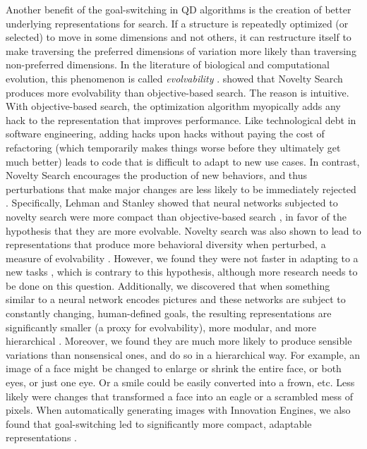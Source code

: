 \documentclass{article}
\begin{document}
Another benefit of the goal-switching in QD algorithms is the creation of better underlying representations for search. If a structure is repeatedly optimized (or selected) to move in some dimensions and not others, it can restructure itself to make traversing the preferred dimensions of variation more likely than traversing non-preferred dimensions. In the literature of biological and computational evolution, this phenomenon is called \emph{evolvability} \cite{kounios2016resolving,kouvaris2015evolution,wagner1996perspective,conrad1979bootstrapping,pigliucci2008evolvability,wagner2013robustness,mengistu2016evolvability}. \citet{lehman2011abandoning} showed that Novelty Search produces more evolvability than objective-based search. The reason is intuitive. With objective-based search, the optimization algorithm myopically adds any hack to the representation that improves performance. Like technological debt in software engineering, adding hacks upon hacks without paying the cost of refactoring (which temporarily makes things worse before they ultimately get much better) leads to code that is difficult to adapt to new use cases. In contrast, Novelty Search encourages the production of new behaviors, and thus perturbations that make major changes are less likely to be immediately rejected \cite{lehman2010efficiently}. Specifically, Lehman and Stanley showed that neural networks subjected to novelty search were more compact than objective-based search \cite{lehman2011abandoning,lehman2011improving}, in favor of the hypothesis that they are more evolvable. Novelty search was also shown to lead to representations that produce more behavioral diversity when perturbed, a measure of evolvability \cite{lehman2011improving}. However, we found they were not faster in adapting to a new tasks \cite{velez2014novelty}, which is contrary to this hypothesis, although more research needs to be done on this question.  Additionally, we discovered that when something similar to a neural network encodes pictures and these networks are subject to constantly changing, human-defined goals, the resulting representations are significantly smaller (a proxy for evolvability), more modular, and more hierarchical \cite{huizinga2017emergence}. Moreover, we found they are much more likely to produce sensible variations than nonsensical ones, and do so in a hierarchical way. For example, an image of a face might be changed to enlarge or shrink the entire face, or both eyes, or just one eye. Or a smile could be easily converted into a frown, etc. Less likely were changes that transformed a face into an eagle or a scrambled mess of pixels. When automatically generating images with Innovation Engines, we also found that goal-switching led to significantly more compact, adaptable representations \cite{nguyen2016understanding}.
\end{document}
